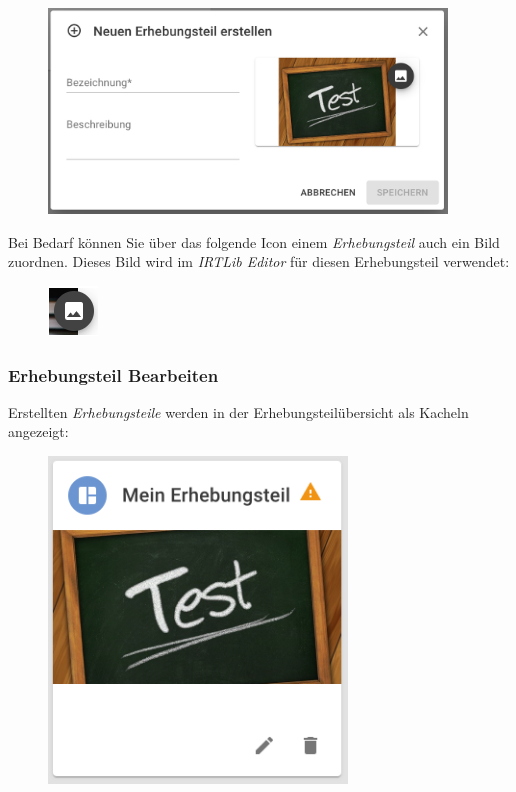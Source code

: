 \documentclass[
  letterpaper,
  DIV=11]{scrreprt}
\begin{document}
\begin{tcolorbox}
\begin{figure}[H]
\includegraphics[width=4.16667in,height=\textheight]{img/screenshot-new-study-part-empty-DEU.png} \hfill{}

\end{figure}

Bei Bedarf können Sie über das folgende Icon einem \emph{Erhebungsteil}
auch ein Bild zuordnen. Dieses Bild wird im \emph{IRTLib Editor} für
diesen Erhebungsteil verwendet:

\begin{figure}[H]

\includegraphics{img/icon-study-image.png} \hfill{}

\end{figure}

\hypertarget{erhebungsteil-bearbeiten-1}{%
\subsubsection{Erhebungsteil
Bearbeiten}\label{erhebungsteil-bearbeiten-1}}

Erstellten \emph{Erhebungsteile} werden in der Erhebungsteilübersicht
als Kacheln angezeigt:

\begin{figure}[H]

\includegraphics[width=3.125in,height=\textheight]{img/screenshot-new-study-part-card.DEU.png} \hfill{}


\end{figure}
\end{tcolorbox}
\end{document}
